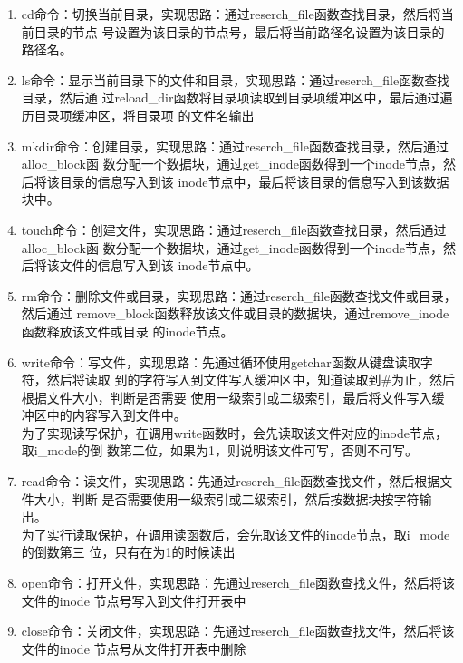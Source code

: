 \documentclass{article}
\begin{document}
\begin{enumerate}
        \begin{enumerate}
            \item cd命令：切换当前目录，实现思路：通过reserch\_file函数查找目录，然后将当前目录的节点
            号设置为该目录的节点号，最后将当前路径名设置为该目录的路径名。
            \item ls命令：显示当前目录下的文件和目录，实现思路：通过reserch\_file函数查找目录，然后通
            过reload\_dir函数将目录项读取到目录项缓冲区中，最后通过遍历目录项缓冲区，将目录项
            的文件名输出
            \item mkdir命令：创建目录，实现思路：通过reserch\_file函数查找目录，然后通过alloc\_block函
            数分配一个数据块，通过get\_inode函数得到一个inode节点，然后将该目录的信息写入到该
            inode节点中，最后将该目录的信息写入到该数据块中。
            \item touch命令：创建文件，实现思路：通过reserch\_file函数查找目录，然后通过alloc\_block函
            数分配一个数据块，通过get\_inode函数得到一个inode节点，然后将该文件的信息写入到该
            inode节点中。
            \item rm命令：删除文件或目录，实现思路：通过reserch\_file函数查找文件或目录，然后通过
            remove\_block函数释放该文件或目录的数据块，通过remove\_inode函数释放该文件或目录
            的inode节点。
            \item write命令：写文件，实现思路：先通过循环使用getchar函数从键盘读取字符，然后将读取
            到的字符写入到文件写入缓冲区中，知道读取到\#为止，然后根据文件大小，判断是否需要
            使用一级索引或二级索引，最后将文件写入缓冲区中的内容写入到文件中。\\
            为了实现读写保护，在调用write函数时，会先读取该文件对应的inode节点，取i\_mode的倒
            数第二位，如果为1，则说明该文件可写，否则不可写。
            \item  read命令：读文件，实现思路：先通过reserch\_file函数查找文件，然后根据文件大小，判断
            是否需要使用一级索引或二级索引，然后按数据块按字符输出。\\
            为了实行读取保护，在调用读函数后，会先取该文件的inode节点，取i\_mode的倒数第三
            位，只有在为1的时候读出
            \item open命令：打开文件，实现思路：先通过reserch\_file函数查找文件，然后将该文件的inode
            节点号写入到文件打开表中
            \item close命令：关闭文件，实现思路：先通过reserch\_file函数查找文件，然后将该文件的inode
            节点号从文件打开表中删除

\end{enumerate}
\end{enumerate}
\end{document}
